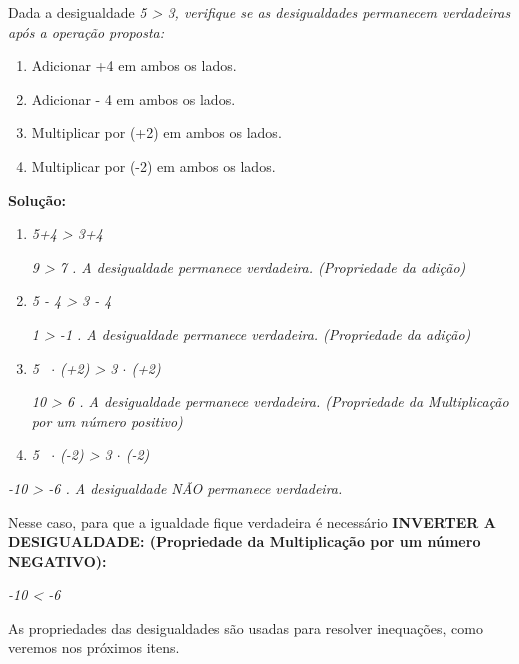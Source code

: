 \begin{texemplo}
    Dada a desigualdade \textit{5 > 3, verifique se as desigualdades permanecem verdadeiras após a operação proposta:}

\begin{enumerate}
	\item Adicionar +4 em ambos os lados.

	\item Adicionar - 4  em ambos os lados.

	\item Multiplicar por (+2) em ambos os lados.

	\item Multiplicar por (-2) em ambos os lados.
\end{enumerate}

\textbf{Solução: }

\begin{enumerate}
	\item \textit{5+4 > 3+4}

\textit{9 > 7 . A desigualdade permanece verdadeira. (Propriedade da adição)}

	\item \textit{5 - 4 > 3 - 4}

\textit{1 > -1 . A desigualdade permanece verdadeira. (Propriedade da adição)}

	\item \textit{5~ $ \cdot $  (+2)  > 3 $ \cdot $  (+2)}

\textit{10 > 6 . A desigualdade permanece verdadeira. (Propriedade da Multiplicação por um número positivo)}

	\item \textit{5~ $ \cdot $  (-2)  > 3 $ \cdot $  (-2)}
\end{enumerate}

\textit{-10 > -6 . A desigualdade NÃO permanece verdadeira.}

Nesse caso, para que a igualdade fique verdadeira é necessário \textbf{INVERTER A DESIGUALDADE: (Propriedade da Multiplicação por um número NEGATIVO):}

\textit{-10 < -6 \qedsymbol{}}
\end{texemplo}

As propriedades das desigualdades são usadas para resolver inequações, como veremos nos próximos itens.

